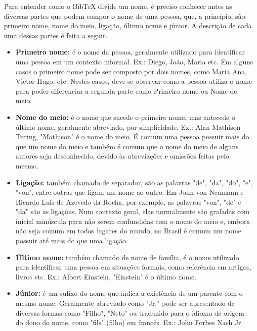 \begin{anexosenv}
Para entender como o BibTeX divide um nome, é preciso conhecer antes as diversas
partes que podem compor o nome de uma pessoa, que, a princípio, são: primeiro
nome, nome do meio, ligação, último nome e júnior. A descrição de cada uma
dessas partes é feita a seguir.

\begin{itemize}
    \item \textbf{Primeiro nome:} é o nome da pessoa, geralmente utilizado para
    identificar uma pessoa em um contexto informal. Ex.: Diego, João, Maria etc.
    Em alguns casos o primeiro nome pode ser composto por dois nomes, como Maria
    Ana, Victor Hugo, etc. Nestes casos, deve-se observar como a pessoa utiliza
    o nome para poder diferenciar a segunda parte como Primeiro nome ou Nome do
    meio.

    \item \textbf{Nome do meio:} é o nome que sucede o primeiro nome, mas
    antecede o último nome, geralmente abreviado, por simplicidade. Ex.: Alan
    Mathison Turing, "Mathison"{} é o nome do meio. É comum uma pessoa possuir
    mais do que um nome do meio e também é comum que o nome do meio de alguns
    autores seja desconhecido, devido às abreviações e omissões feitas pelo
    mesmo.

    \item \textbf{Ligação:} também chamado de separador, são as palavras "de"{},
    "da"{}, "do"{}, "e"{}, "von"{}, entre outras que ligam um nome ao outro. Em
    John von Neumann e Ricardo Luis de Azevedo da Rocha, por exemplo, as
    palavras "von"{}, "de"{}  e "da"{}  são as ligações. Num contexto geral,
    elas normalmente são grafadas com inicial minúscula para não serem
    confundidas com o nome do meio e, embora não seja comum em todos lugares do
    mundo, no Brasil é comum um nome possuir até mais do que uma ligação.

    \item \textbf{Último nome:} também chamado de nome de família, é o nome
    utilizado para identificar uma pessoa em situações formais, como referência
    em artigos, livros etc. Ex.: Albert Einstein, "Einstein"{} é o último nome.

\item \textbf{Júnior:} é um sufixo do nome que indica a existência de um parente
com o mesmo nome. Geralmente abreviado como "Jr."{} pode ser apresentado de
diversas formas como "Filho"{}, "Neto"{} ou traduzido para o idioma de origem
do dono do nome, como "fils"{} (filho) em francês. Ex.: John Forbes Nash Jr.
\end{itemize}


\end{anexosenv}
